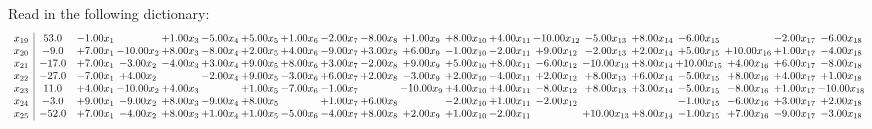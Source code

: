 \documentclass[9pt]{article}
\begin{document}
Read in the following dictionary:
\[\begin{array}{c| c c@{\hskip 2pt} c@{\hskip 2pt} c@{\hskip 2pt} c@{\hskip 2pt} c@{\hskip 2pt} c@{\hskip 2pt} c@{\hskip 2pt} c@{\hskip 2pt} c@{\hskip 2pt} c@{\hskip 2pt} c@{\hskip 2pt} c@{\hskip 2pt} c@{\hskip 2pt} c@{\hskip 2pt} c@{\hskip 2pt} c@{\hskip 2pt} c@{\hskip 2pt} c@{\hskip 2pt} }
 x_{19}   &  53.0 & -1.00 x_{1} &   & +  1.00 x_{3} & -5.00 x_{4} & +  5.00 x_{5} & +  1.00 x_{6} & -2.00 x_{7} & -8.00 x_{8} & +  1.00 x_{9} & +  8.00 x_{10} & +  4.00 x_{11} & -10.00 x_{12} & -5.00 x_{13} & +  8.00 x_{14} & -6.00 x_{15} &   & -2.00 x_{17} & -6.00 x_{18}\\
 x_{20}   &  -9.0 & +  7.00 x_{1} & -10.00 x_{2} & +  8.00 x_{3} & -8.00 x_{4} & +  2.00 x_{5} & +  4.00 x_{6} & -9.00 x_{7} & +  3.00 x_{8} & +  6.00 x_{9} & -1.00 x_{10} & -2.00 x_{11} & +  9.00 x_{12} & -2.00 x_{13} & +  2.00 x_{14} & +  5.00 x_{15} & + 10.00 x_{16} & +  1.00 x_{17} & -4.00 x_{18}\\
 x_{21}   &  -17.0 & +  7.00 x_{1} & -3.00 x_{2} & -4.00 x_{3} & +  3.00 x_{4} & +  9.00 x_{5} & +  8.00 x_{6} & +  3.00 x_{7} & -2.00 x_{8} & +  9.00 x_{9} & +  5.00 x_{10} & +  8.00 x_{11} & -6.00 x_{12} & -10.00 x_{13} & +  8.00 x_{14} & + 10.00 x_{15} & +  4.00 x_{16} & +  6.00 x_{17} & -8.00 x_{18}\\
 x_{22}   &  -27.0 & -7.00 x_{1} & +  4.00 x_{2} &   & -2.00 x_{4} & +  9.00 x_{5} & -3.00 x_{6} & +  6.00 x_{7} & +  2.00 x_{8} & -3.00 x_{9} & +  2.00 x_{10} & -4.00 x_{11} & +  2.00 x_{12} & +  8.00 x_{13} & +  6.00 x_{14} & -5.00 x_{15} & +  8.00 x_{16} & +  4.00 x_{17} & +  1.00 x_{18}\\
 x_{23}   &  11.0 & +  4.00 x_{1} & -10.00 x_{2} & +  4.00 x_{3} &   & +  1.00 x_{5} & -7.00 x_{6} & -1.00 x_{7} &   & -10.00 x_{9} & +  4.00 x_{10} & +  4.00 x_{11} & -8.00 x_{12} & +  8.00 x_{13} & +  3.00 x_{14} & -5.00 x_{15} & -8.00 x_{16} & +  1.00 x_{17} & -10.00 x_{18}\\
 x_{24}   &  -3.0 & +  9.00 x_{1} & -9.00 x_{2} & +  8.00 x_{3} & -9.00 x_{4} & +  8.00 x_{5} &   & +  1.00 x_{7} & +  6.00 x_{8} &   & -2.00 x_{10} & +  1.00 x_{11} & -2.00 x_{12} &    &   & -1.00 x_{15} & -6.00 x_{16} & +  3.00 x_{17} & +  2.00 x_{18}\\
 x_{25}   &  -52.0 & +  7.00 x_{1} & -4.00 x_{2} & +  8.00 x_{3} & +  1.00 x_{4} & +  1.00 x_{5} & -5.00 x_{6} & -4.00 x_{7} & +  8.00 x_{8} & +  2.00 x_{9} & +  1.00 x_{10} & -2.00 x_{11} &   & + 10.00 x_{13} & +  8.00 x_{14} & -1.00 x_{15} & +  7.00 x_{16} & -9.00 x_{17} & -3.00 x_{18}\\

\end{array}\]
\end{document}
